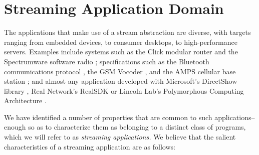 \section{Streaming Application Domain}
\label{sec:domain}

The applications that make use of a stream abstraction are diverse,
with targets ranging from embedded devices, to consumer desktops, to
high-performance servers.  Examples include systems such as the Click
modular router \cite{click} and the Spectrumware software radio
\cite{spectrumware,softwareradio}; specifications such as the
Bluetooth communications protocol \cite{bluetooth}, the GSM Vocoder
\cite{gsm}, and the AMPS cellular base station \cite{amps}; and almost
any application developed with Microsoft's DirectShow library
\cite{directshow}, Real Network's RealSDK \cite{realsdk} or Lincoln
Lab's Polymorphous Computing Architecture \cite{pca}.

We have identified a number of properties that are common to such
applications--enough so as to characterize them as belonging to a
distinct class of programs, which we will refer to as {\it streaming
applications.}  We believe that the salient characteristics of a
streaming application are as follows:

